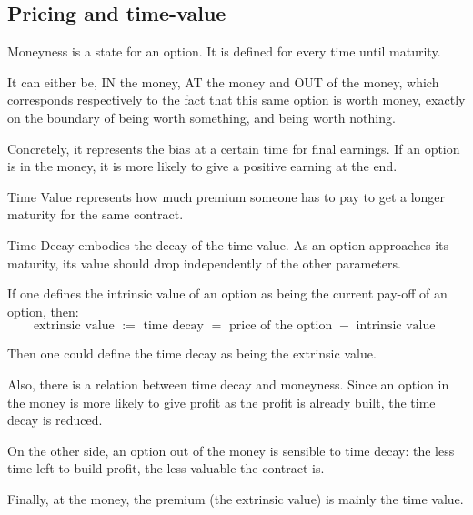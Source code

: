 \subsection{Pricing and time-value}


\begin{definition}[Moneyness]
Moneyness is a state for an option. It is defined for every time until maturity. 

It can either be, IN the money, AT the money and OUT of the money, which corresponds respectively to the fact that this same option is worth money, exactly on the boundary of being worth something, and being worth nothing. 

Concretely, it represents the bias at a certain time for final earnings. If an option is in the money, it is more likely to give a positive earning at the end.  
\end{definition}

\begin{definition}
Time Value represents how much premium someone has to pay to get a longer maturity for the same contract. 
\end{definition}

\begin{definition}
Time Decay embodies the decay of the time value. As an option approaches its maturity, its value should drop independently of the other parameters. 

If one defines the intrinsic value of an option as being the current pay-off of an option, then:
$$\text{extrinsic value } := \text{ time decay } =  \text{ price of the option } - \text{ intrinsic value } $$

Then one could define the time decay as being the extrinsic value.
\end{definition}

Also, there is a relation between time decay and moneyness. Since an option in the money is more likely to give profit as the profit is already built, the time decay is reduced. 

On the other side, an option out of the money is sensible to time decay: the less time left to build profit, the less valuable the contract is. 

Finally, at the money, the premium (the extrinsic value) is mainly the time value.









